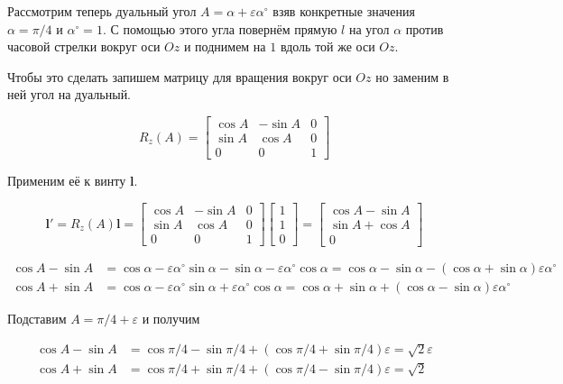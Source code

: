 \documentclass[%
]{ittmm}
\begin{document}
Рассмотрим теперь дуальный угол $A=\alpha+\varepsilon \alpha^\circ$ взяв конкретные значения $\alpha=\pi/4$ и $\alpha^\circ=1$. С помощью этого угла повернём прямую $l$
на угол $\alpha$ против часовой стрелки вокруг оси $Oz$ и поднимем на $1$ вдоль той же оси $Oz$. 

Чтобы это сделать запишем матрицу для вращения вокруг оси $Oz$ но заменим в ней угол на дуальный.

\begin{equation*}
  R_z(A)=
  \begin{bmatrix}
    \cos A & -\sin A & 0 \\
    \sin A & \cos A & 0 \\
    0 & 0 & 1
  \end{bmatrix}
\end{equation*}

Применим её к винту $\mathbf{l}$.

\begin{equation*}
  \mathbf{l}'=R_z(A)\mathbf{l}=
  \begin{bmatrix}
    \cos A & -\sin A & 0 \\
    \sin A & \cos A & 0 \\
    0 & 0 & 1
  \end{bmatrix}
  \begin{bmatrix}
    1 \\
    1 \\
    0
  \end{bmatrix}
  =
  \begin{bmatrix}
    \cos A - \sin A \\
    \sin A + \cos A \\
    0
  \end{bmatrix}
\end{equation*}

\begin{align*}
    \cos A - \sin A & =\cos \alpha - \varepsilon \alpha^\circ \sin \alpha - \sin \alpha - \varepsilon \alpha^\circ \cos \alpha =
  \cos \alpha - \sin \alpha - (\cos \alpha + \sin \alpha)\varepsilon \alpha^\circ \\
  \cos A + \sin A & = \cos \alpha - \varepsilon \alpha^\circ \sin \alpha + \varepsilon \alpha^\circ \cos \alpha =
  \cos \alpha + \sin \alpha + (\cos \alpha - \sin \alpha)\varepsilon \alpha^\circ
\end{align*}

Подставим $A=\pi/4+\varepsilon$ и получим

\begin{align*}
  \cos A - \sin A & = \cos \pi/4 - \sin \pi/4 + (\cos \pi/4 + \sin \pi/4)\varepsilon = \sqrt{2} \varepsilon \\
  \cos A + \sin A & = \cos \pi/4 + \sin \pi/4 + (\cos \pi/4 - \sin \pi/4)\varepsilon = \sqrt{2}
\end{align*}
\end{document}
